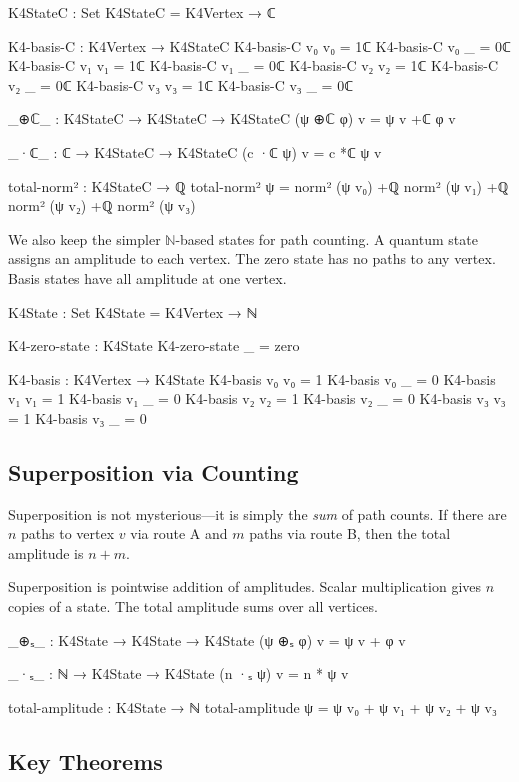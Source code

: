 \documentclass[11pt,a4paper]{book}
\begin{document}
\begin{code}
K4StateC : Set
K4StateC = K4Vertex → ℂ

K4-basis-C : K4Vertex → K4StateC
K4-basis-C v₀ v₀ = 1ℂ
K4-basis-C v₀ _  = 0ℂ
K4-basis-C v₁ v₁ = 1ℂ
K4-basis-C v₁ _  = 0ℂ
K4-basis-C v₂ v₂ = 1ℂ
K4-basis-C v₂ _  = 0ℂ
K4-basis-C v₃ v₃ = 1ℂ
K4-basis-C v₃ _  = 0ℂ

_⊕ℂ_ : K4StateC → K4StateC → K4StateC
(ψ ⊕ℂ φ) v = ψ v +ℂ φ v

_·ℂ_ : ℂ → K4StateC → K4StateC
(c ·ℂ ψ) v = c *ℂ ψ v

total-norm² : K4StateC → ℚ
total-norm² ψ = norm² (ψ v₀) +ℚ norm² (ψ v₁) +ℚ norm² (ψ v₂) +ℚ norm² (ψ v₃)
\end{code}

We also keep the simpler $\mathbb{N}$-based states for path counting. A quantum state assigns an amplitude to each vertex. The zero state has no paths to any vertex. Basis states have all amplitude at one vertex.

\begin{code}
K4State : Set
K4State = K4Vertex → ℕ

K4-zero-state : K4State
K4-zero-state _ = zero

K4-basis : K4Vertex → K4State
K4-basis v₀ v₀ = 1
K4-basis v₀ _  = 0
K4-basis v₁ v₁ = 1
K4-basis v₁ _  = 0
K4-basis v₂ v₂ = 1
K4-basis v₂ _  = 0
K4-basis v₃ v₃ = 1
K4-basis v₃ _  = 0
\end{code}

\subsection{Superposition via Counting}

Superposition is not mysterious—it is simply the \emph{sum} of path counts.
If there are $n$ paths to vertex $v$ via route A and $m$ paths via route B,
then the total amplitude is $n + m$.

Superposition is pointwise addition of amplitudes. Scalar multiplication gives $n$ copies of a state. The total amplitude sums over all vertices.

\begin{code}
_⊕ₛ_ : K4State → K4State → K4State
(ψ ⊕ₛ φ) v = ψ v + φ v

_·ₛ_ : ℕ → K4State → K4State
(n ·ₛ ψ) v = n * ψ v

total-amplitude : K4State → ℕ
total-amplitude ψ = ψ v₀ + ψ v₁ + ψ v₂ + ψ v₃
\end{code}

\subsection{Key Theorems}
\end{document}
